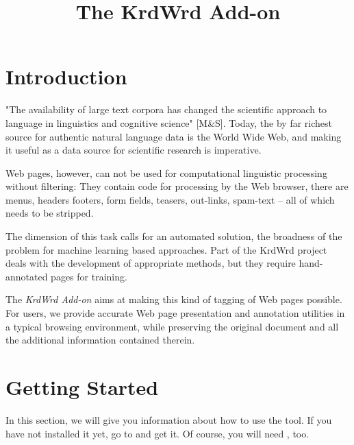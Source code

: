 \documentclass[12pt]{article}
\title{The KrdWrd Add-on}
\author{}
\begin{document}
\maketitle

\section{Introduction}


"The availability of large text corpora has changed the scientific approach to language in linguistics and cognitive science" [M\&S].
Today, the by far richest source for authentic natural language data is the World Wide Web, and making it useful as a data source for scientific research is imperative.

Web pages, however, can not be used for computational linguistic processing without filtering:
They contain code for processing by the Web browser, there are menus, headers footers, form fields, teasers, out-links, spam-text -- all of which needs to be stripped.

The dimension of this task calls for an automated solution, the broadness of the problem for machine learning based approaches.
Part of the KrdWrd project deals with the development of appropriate methods, but they require hand-annotated pages for training.

The \textit{KrdWrd Add-on} aims at making this kind of tagging of Web pages possible.
For users, we provide accurate Web page presentation and annotation utilities in a typical browsing environment, while preserving the original document and all the additional information contained therein.


\section{Getting Started}
In this section, we will give you information about how to use the tool. If you have not installed it yet, go to  and get it. Of course, you will need , too. \\
\end{document}
